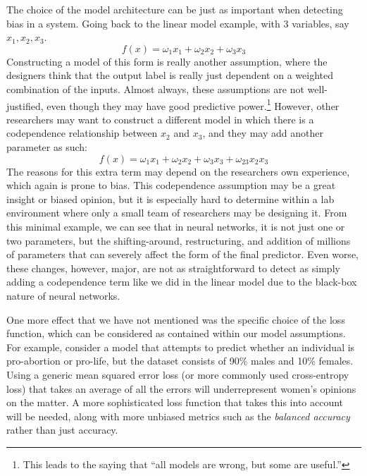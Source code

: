 \documentclass[10pt]{article}
\begin{document}
    The choice of the model architecture can be just as important when detecting bias in a system. Going back to the linear model example, with 3 variables, say $x_1, x_2, x_3$. 
    \begin{equation}
      f(x) = \omega_1 x_1 + \omega_2 x_2 + \omega_3 x_3
    \end{equation}
    Constructing a model of this form is really another assumption, where the designers think that the output label is really just dependent on a weighted combination of the inputs. Almost always, these assumptions are not well-justified, even though they may have good predictive power.\footnote{This leads to the saying that ``all models are wrong, but some are useful.''} However, other researchers may want to construct a different model in which there is a codependence relationship between $x_2$ and $x_3$, and they may add another parameter as such: 
    \begin{equation}
      f(x) = \omega_1 x_1 + \omega_2 x_2 + \omega_3 x_3 + \omega_{23} x_2 x_3
    \end{equation}
    The reasons for this extra term may depend on the researchers own experience, which again is prone to bias. This codependence assumption may be a great insight or biased opinion, but it is especially hard to determine within a lab environment where only a small team of researchers may be designing it. From this minimal example, we can see that in neural networks, it is not just one or two parameters, but the shifting-around, restructuring, and addition of millions of parameters that can severely affect the form of the final predictor. Even worse, these changes, however, major, are not as straightforward to detect as simply adding a codependence term like we did in the linear model due to the black-box nature of neural networks. 

    One more effect that we have not mentioned was the specific choice of the loss function, which can be considered as contained within our model assumptions. For example, consider a model that attempts to predict whether an individual is pro-abortion or pro-life, but the dataset consists of 90\% males and 10\% females. Using a generic mean squared error loss (or more commonly used cross-entropy loss) that takes an average of all the errors will underrepresent women's opinions on the matter. A more sophisticated loss function that takes this into account will be needed, along with more unbiased metrics such as the \textit{balanced accuracy} rather than just accuracy. 
\end{document}
